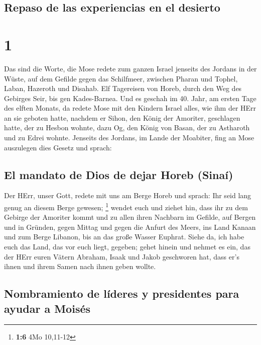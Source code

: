 \hypertarget{repaso-de-las-experiencias-en-el-desierto}{%
\subsection{Repaso de las experiencias en el
desierto}\label{repaso-de-las-experiencias-en-el-desierto}}

\hypertarget{section}{%
\section{1}\label{section}}

 Das sind die Worte, die Mose redete zum ganzen Israel
jenseits des Jordans in der Wüste, auf dem Gefilde gegen das Schilfmeer,
zwischen Pharan und Tophel, Laban, Hazeroth und Disahab. 
Elf Tagereisen von Horeb, durch den Weg des Gebirges Seir, bis gen
Kades-Barnea.  Und es geschah im 40. Jahr, am ersten Tage
des elften Monats, da redete Mose mit den Kindern Israel alles, wie ihm
der HErr an sie geboten hatte,  nachdem er Sihon, den
König der Amoriter, geschlagen hatte, der zu Hesbon wohnte, dazu Og, den
König von Basan, der zu Astharoth und zu Edrei wohnte. 
Jenseits des Jordans, im Lande der Moabiter, fing an Mose auszulegen
dies Gesetz und sprach:

\hypertarget{el-mandato-de-dios-de-dejar-horeb-sinauxed}{%
\subsection{El mandato de Dios de dejar Horeb
(Sinaí)}\label{el-mandato-de-dios-de-dejar-horeb-sinauxed}}

 Der HErr, unser Gott, redete mit uns am Berge Horeb und
sprach: Ihr seid lang genug an diesem Berge gewesen; \footnote{\textbf{1:6}
  4Mo 10,11-12}  wendet euch und ziehet hin, dass ihr zu
dem Gebirge der Amoriter kommt und zu allen ihren Nachbarn im Gefilde,
auf Bergen und in Gründen, gegen Mittag und gegen die Anfurt des Meers,
ins Land Kanaan und zum Berge Libanon, bis an das große Wasser Euphrat.
 Siehe da, ich habe euch das Land, das vor euch liegt,
gegeben; gehet hinein und nehmet es ein, das der HErr euren Vätern
Abraham, Isaak und Jakob geschworen hat, dass er's ihnen und ihrem Samen
nach ihnen geben wollte.

\hypertarget{nombramiento-de-luxedderes-y-presidentes-para-ayudar-a-moisuxe9s}{%
\subsection{Nombramiento de líderes y presidentes para ayudar a
Moisés}\label{nombramiento-de-luxedderes-y-presidentes-para-ayudar-a-moisuxe9s}}

